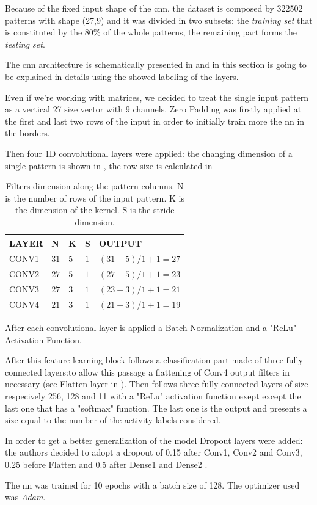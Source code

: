Because of the fixed input shape of the \gls{cnn}, the dataset  is composed by 322502 patterns with shape (27,9) and it was divided in two subsets: the \textit{training set} that is constituted by the 80\% of the whole patterns, the remaining part forms the \textit{testing set}.

The \gls{cnn} architecture is schematically presented in  and in this section is going to be explained in details using the showed labeling of the layers. 

Even if we're working with matrices, we decided to treat the single input pattern as a vertical 27 size vector with 9 channels. Zero Padding was firstly applied at the first and last two rows of the input in order to initially train more the \gls{nn} in the borders.

Then four 1D convolutional layers were applied: the changing dimension of a single pattern is shown in , the row size is calculated in 

\begin{table}[htp]
\small
	\centering
		\renewcommand{\arraystretch}{1}%
	\begin{tabular}{@{}lllll@{}}
	\toprule
	LAYER & N & K & S & OUTPUT\\
	\midrule
	CONV1 & $31$ & $5$ & $1$ & $(31-5)/1+1 = 27$\\
	CONV2 & $27$ & $5$ & $1$ & $(27-5)/1+1 = 23$\\
	CONV3 & $27$ & $3$ & $1$ & $(23-3)/1+1 = 21$\\
	CONV4 & $21$ & $3$ & $1$ & $(21-3)/1+1 = 19$\\
	\bottomrule
	\end{tabular}
	\caption{Filters dimension along the pattern columns. N is the number of rows of the input pattern. K is the dimension of the kernel. S is the stride dimension.}
	\label{tab:filtersize}
\end{table}

After each convolutional layer is applied a Batch Normalization and a "ReLu" Activation Function.

After this feature learning block follows a classification part made of three fully connected layers:to allow this passage a flattening of Conv4 output filters in necessary (see Flatten layer in ). Then follows three fully connected layers of size respecively 256, 128 and 11 with a "ReLu" activation function exept except the last one that has a "softmax" function. The last one is the output and presents a size equal to the number of the activity labels considered.

In order to get a better generalization of the model Dropout layers were added: the authors decided to adopt a dropout of 0.15 after Conv1, Conv2 and Conv3, 0.25 before Flatten and 0.5 after Dense1 and Dense2 .




The \gls{nn} was trained for 10 epochs with a batch size of 128. The optimizer used was \textit{Adam}.  




